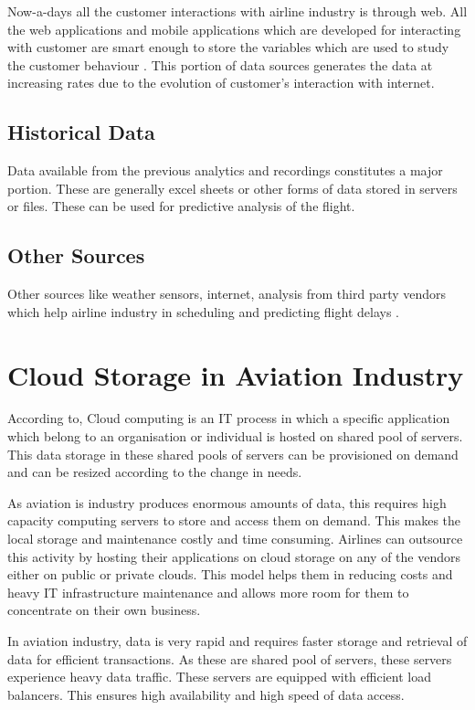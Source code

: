 \documentclass[sigconf]{acmart}
\begin{document}
Now-a-days all the customer interactions with airline industry is through web. All the web applications and mobile applications which are developed for interacting with customer are smart enough to store the variables which are used to study the customer behaviour   \cite{EXASTAX2017}.  This portion of data sources generates the data at increasing rates due to the evolution of customer’s interaction with internet. 

\subsection{Historical Data}

Data available from the previous analytics and recordings constitutes a major portion. These are generally excel sheets or other forms of data stored in servers or files.  These can be used for predictive analysis of the flight.
\subsection{Other Sources}
Other sources like weather sensors, internet, analysis from third party vendors which help airline industry in scheduling and predicting flight delays .

\section{Cloud Storage in Aviation Industry}

According to\cite{Wikipedia2017}, Cloud computing is an IT process in which a specific application which belong to an organisation or individual is hosted on shared pool of servers. This data storage in these shared pools of servers can be provisioned on demand and can be resized according to the change in needs.

As aviation is industry produces enormous amounts of data, this requires high capacity computing servers to store and access them on demand. This makes the local storage and maintenance costly and time consuming. Airlines can outsource this activity by hosting their applications on cloud storage on any of the vendors either on public or private clouds\cite{6548579}. This model helps them in reducing costs and heavy IT infrastructure maintenance and allows more room for them to concentrate on their own business. 

In aviation industry, data is very rapid and requires faster storage and retrieval of data for efficient transactions. As these are shared pool of servers, these servers experience heavy data traffic. These servers are equipped with efficient load balancers. This ensures high availability and high speed of data access.
\end{document}
